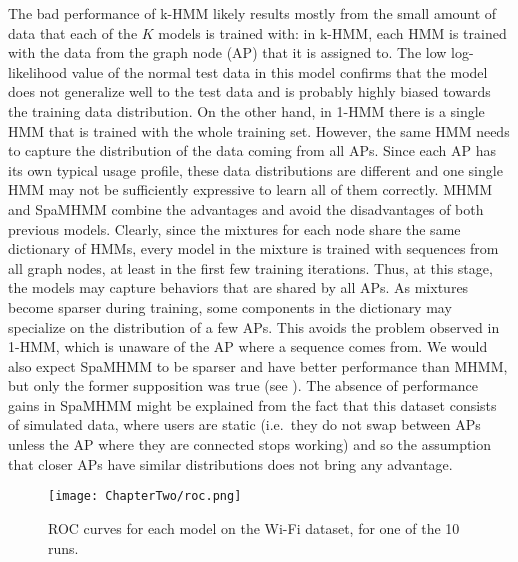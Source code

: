 The bad performance of k-HMM likely results mostly from the small amount of data that each of the $K$ models is trained with: in k-HMM, each HMM is trained with the data from the graph node (AP) that it is assigned to. The low log-likelihood value of the normal test data in this model confirms that the model does not generalize well to the test data and is probably highly biased towards the training data distribution. On the other hand, in 1-HMM there is a single HMM that is trained with the whole training set. However, the same HMM needs to capture the distribution of the data coming from all APs. Since each AP has its own typical usage profile, these data distributions are different and one single HMM may not be sufficiently expressive to learn all of them correctly. MHMM and SpaMHMM combine the advantages and avoid the disadvantages of both previous models. Clearly, since the mixtures for each node share the same dictionary of HMMs, every model in the mixture is trained with sequences from all graph nodes, at least in the first few training iterations. Thus, at this stage, the models may capture behaviors that are shared by all APs. As mixtures become sparser during training, some components in the dictionary may specialize on the distribution of a few APs. This avoids the problem observed in 1-HMM, which is unaware of the AP where a sequence comes from. We would also expect SpaMHMM to be sparser and have better performance than MHMM, but only the former supposition was true (see ). The absence of performance gains in SpaMHMM might be explained from the fact that this dataset consists of simulated data, where users are static (i.e.\ they do not swap between APs unless the AP where they are connected stops working) and so the assumption that closer APs have similar distributions does not bring any advantage.

\begin{figure}
	\centering
	\texttt{[image: ChapterTwo/roc.png]}
	\caption{ROC curves for each model on the Wi-Fi dataset, for one of the 10 runs.}
	\label{fig:spamhmm_wifi_roc}
\end{figure}

